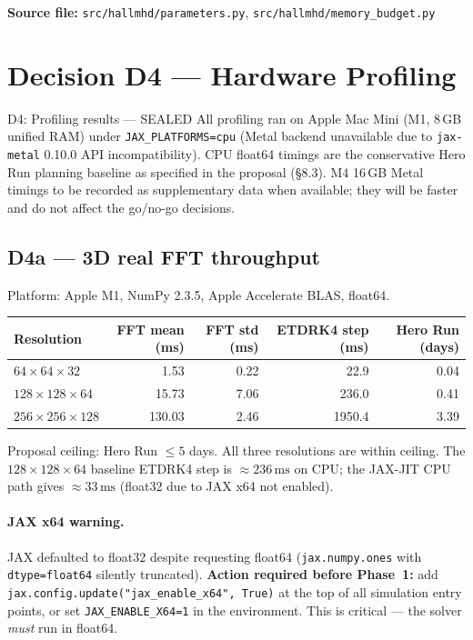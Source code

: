 \documentclass[11pt, a4paper]{article}
\begin{document}
\noindent\textbf{Source file:} \texttt{src/hallmhd/parameters.py},
\texttt{src/hallmhd/memory\_budget.py}

\section{Decision D4 --- Hardware Profiling}
\label{sec:d4}

\begin{sealbox}{D4: Profiling results --- SEALED}
All profiling ran on Apple Mac Mini (M1, 8\,GB unified RAM) under
\texttt{JAX\_PLATFORMS=cpu} (Metal backend unavailable due to
\texttt{jax-metal} 0.10.0 API incompatibility).
CPU float64 timings are the conservative Hero Run planning baseline
as specified in the proposal (\S8.3).
M4 16\,GB Metal timings to be recorded as supplementary data when
available; they will be faster and do not affect the go/no-go decisions.
\end{sealbox}

\subsection{D4a --- 3D real FFT throughput}

Platform: Apple M1, NumPy 2.3.5, Apple Accelerate BLAS, float64.

\begin{center}
\begin{tabular}{lrrrr}
\toprule
Resolution & FFT mean (ms) & FFT std (ms) &
  ETDRK4 step (ms) & Hero Run (days) \\
\midrule
$64\times64\times32$    &  1.53 & 0.22 &  22.9 & 0.04 \\
$128\times128\times64$  & 15.73 & 7.06 & 236.0 & 0.41 \\
$256\times256\times128$ & 130.03 & 2.46 & 1950.4 & 3.39 \\
\bottomrule
\end{tabular}
\end{center}

\noindent
Proposal ceiling: Hero Run $\leq 5$ days.
All three resolutions are within ceiling.
The $128\times128\times64$ baseline ETDRK4 step is $\approx 236\,\text{ms}$
on CPU; the JAX-JIT CPU path gives $\approx 33\,\text{ms}$ (float32 due to
JAX x64 not enabled).

\paragraph{JAX x64 warning.}
JAX defaulted to float32 despite requesting float64 (\texttt{jax.numpy.ones}
with \texttt{dtype=float64} silently truncated).
\textbf{Action required before Phase~1:} add
\texttt{jax.config.update("jax\_enable\_x64", True)} at the top of all
simulation entry points, or set \texttt{JAX\_ENABLE\_X64=1} in the
environment.  This is critical --- the solver \emph{must} run in float64.
\end{document}
